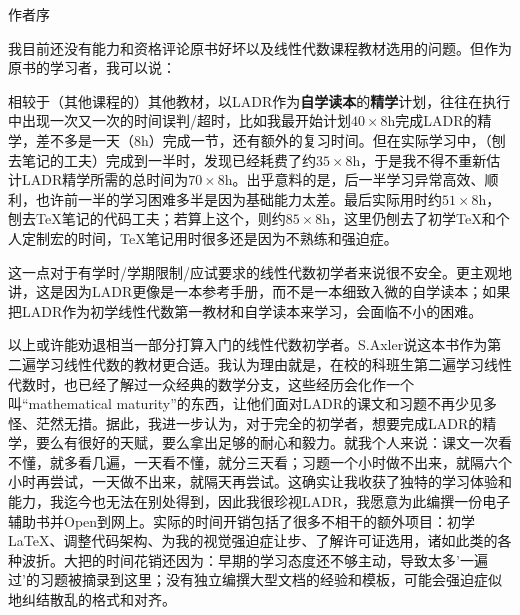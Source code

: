 \centerline{\Large 作者序}\vspace{6pt}\par
{\small 我目前还没有能力和资格评论原书好坏以及线性代数课程教材选用的问题。但作为原书的学习者，我可以说：\par\vspace{2pt}
相较于（其他课程的）其他教材，以LADR作为\textbf{自学读本}的\textbf{精学}计划，往往在执行中出现一次又一次的时间误判/超时，{\footnotesize 比如我最开始计划$40\times 8$h完成LADR的精学，差不多是一天（$8$h）完成一节，还有额外的复习时间。但在实际学习中，（刨去笔记的工夫）完成到一半时，发现已经耗费了约$35\times 8$h，于是我不得不重新估计LADR精学所需的总时间为$70\times 8$h。出乎意料的是，后一半学习异常高效、\!顺利，也许前一半的学习困难多半是因为基础能力太差。最后实际用时约$51\times 8$h，刨去\TeX 笔记的代码工夫；若算上这个，则约$85\times 8$h，这里仍刨去了初学\TeX 和个人定制宏的时间，\TeX 笔记用时很多还是因为不熟练和强迫症。}\par\vspace{4pt}
这一点对于有学时/学期限制/应试要求的线性代数初学者来说很不安全。更主观地讲，这是因为LADR更像是一本参考手册，而不是一本细致入微的自学读本；如果把LADR作为初学线性代数第一教材和自学读本来学习，会面临不小的困难。\par\vspace{4pt}
以上或许能劝退相当一部分打算入门的线性代数初学者。S.Axler说这本书作为第二遍学习线性代数的教材更合适。我认为理由就是，在校的科班生第二遍学习线性代数时，也已经了解过一众经典的数学分支，这些经历会化作一个叫“mathematical maturity”的东西，让他们面对LADR的课文和习题不再少见多怪、茫然无措。据此，我进一步认为，对于完全的初学者，想要完成LADR的精学，要么有很好的天赋，要么拿出足够的耐心和毅力。就我个人来说：课文一次看不懂，就多看几遍，一天看不懂，就分三天看；习题一个小时做不出来，就隔六个小时再尝试，一天做不出来，就隔天再尝试。这确实让我收获了独特的学习体验和能力，我迄今也无法在别处得到，因此我很珍视LADR，我愿意为此编撰一份电子辅助书并Open到网上。{\footnotesize 实际的时间开销包括了很多不相干的额外项目：初学\LaTeX、\!调整代码架构、\!为我的视觉强迫症让步、\!了解许可证选用，诸如此类的各种波折。大把的时间花销还因为：早期的学习态度还不够主动，导致太多'一遍过'的习题被摘录到这里；没有独立编撰大型文档的经验和模板，可能会强迫症似地纠结散乱的格式和对齐。}\par\vspace{4pt}
}

